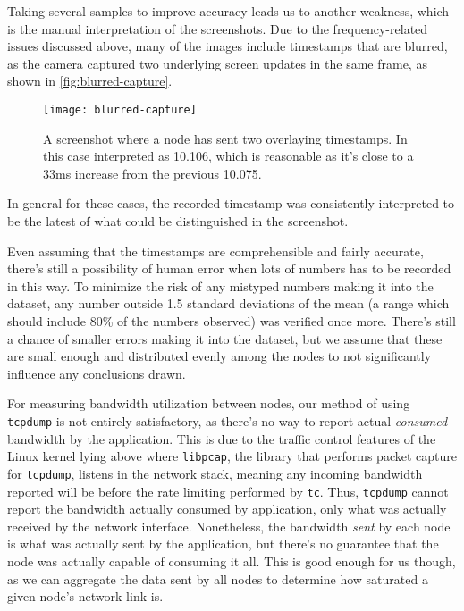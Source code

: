 Taking several samples to improve accuracy leads us to another weakness, which is the manual interpretation of the screenshots. Due to the frequency-related issues discussed above, many of the images include timestamps that are blurred, as the camera captured two underlying screen updates in the same frame, as shown in \autoref{fig:blurred-capture}.

\begin{figure}
    \centering
    \texttt{[image: blurred-capture]}
    \caption{A screenshot where a node has sent two overlaying timestamps. In this case interpreted as 10.106, which is reasonable as it's close to a 33ms increase from the previous 10.075.}
    \label{fig:blurred-capture}
\end{figure}

In general for these cases, the recorded timestamp was consistently interpreted to be the latest of what could be distinguished in the screenshot.

Even assuming that the timestamps are comprehensible and fairly accurate, there's still a possibility of human error when lots of numbers has to be recorded in this way. To minimize the risk of any mistyped numbers making it into the dataset, any number outside 1.5 standard deviations of the mean (a range which should include 80\% of the numbers observed) was verified once more. There's still a chance of smaller errors making it into the dataset, but we assume that these are small enough and distributed evenly among the nodes to not significantly influence any conclusions drawn.

For measuring bandwidth utilization between nodes, our method of using \texttt{tcpdump} is not entirely satisfactory, as there's no way to report actual \emph{consumed} bandwidth by the application. This is due to the traffic control features of the Linux kernel lying above where \texttt{libpcap}, the library that performs packet capture for \texttt{tcpdump}, listens in the network stack, meaning any incoming bandwidth reported will be before the rate limiting performed by \texttt{tc}. Thus, \texttt{tcpdump} cannot report the bandwidth actually consumed by application, only what was actually received by the network interface. Nonetheless, the bandwidth \emph{sent} by each node is what was actually sent by the application, but there's no guarantee that the node was actually capable of consuming it all. This is good enough for us though, as we can aggregate the data sent by all nodes to determine how saturated a given node's network link is.

